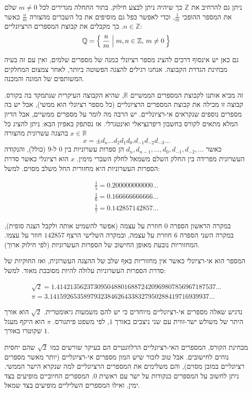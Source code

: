 \documentclass[12pt]{report}
\theoremstyle{plain}
\theoremstyle{definition}
\newcommand{\R}{\mathbb{R}}
\newcommand{\Z}{\mathbb{Z}}
\newcommand{\Q}{\mathbb{Q}}
\newcommand{\0}{\mathbf{0}}
\begin{document}
ניתן גם להרחיב את $\Z$ כך שיהיה ניתן לבצע חילוק. בתור
התחלה מגדירים לכל $m\neq0$ שלם את המספר ההופכי $\frac{1}{m}$,
וכדי לאפשר כפל גם מוסיפים את כל השברים מהצורה $\frac{n}{m}$ כאשר
$n\in\Z$. כך מקבלים את קבוצת המספרים הרציונליים:
$$
\Q=\Set{\frac{n}{m}|m,n\in\Z,\,m\neq0}
$$

גם כאן יש אינסוף דרכים להציג מספר רציונלי כמנה של מספרים שלמים, ואין
עם זה בעיה מבחינת הגדרת הקבוצה. אנחנו רגילים להצגה הפשוטה ביותר, לאחר
צמצום המחלקים המשותפים של המונה והמכנה.

זה מביא אותנו לקבוצת המספרים הממשיים $\R$, שהיא הקבוצה
העיקרית שנתמקד בה בקורס. קבוצה זו מכילה את קבוצת המספרים הרציונליים (כל מספר רציונלי הוא ממשי), אבל יש בה מספרים נוספים שנקראים אי-רציונליים.
יש הרבה מה לומר על מספרים ממשיים, אבל הדיון המלא מתאים לקורס בחשבון
דיפרנציאלי ואינטגרלי. אז נסתפק באפיון הבא: ניתן להציג כל $x\in\R$
בהצגה עשרונית מהצורה
$$
x=\pm d_{n}...d_{2}d_{1}d_{0}.d_{-1}d_{-2}d_{-3}...
$$
 כאשר $d_{n},d_{n-1},...,d_{0},d_{-1},d_{-2},...$ הן ספרות עשרוניות
בין $0$ ל-$9$ (כולל), והנקודה העשרונית מפרידה בין החלק השלם
משמאל לחלק השברי מימין. $x$ הוא רציונלי כאשר סדרת הספרות העשרוניות
היא מחזורית החל משלב מסוים. למשל:

\begin{align*}
\frac{1}{5}=0.200000000000... \\
\frac{1}{6}=0.166666666666...\\
\frac{1}{7}=0.142857142857...
\end{align*}

במקרה הראשון הספרה $0$ חוזרת על עצמה (אפשר להשמיט
אותה ולקבל הצגה סופית), במקרה השני הספרה $6$ חוזרת על עצמה, ובמקרה
השלישי הרצף $142857$ חוזר על עצמו. המחזוריות נובעת מאופן החישוב
של הספרות העשרוניות (לפי חילוק ארוך).

המספר הוא אי-רציונלי כאשר אין מחזוריות באף שלב של ההצגה העשרונית,
ואז החוקיות של סדרת הספרות העשרוניות עלולה להיות מסובכת מאוד. למשל:

\begin{align*}
\sqrt{2}=1.41421356237309504880168872420969807856967187537...\\
\pi=3.14159265358979323846264338327950288419716939937...
\end{align*}

נדגיש שאלה מספרים אי-רציונליים מיוחדים כי יש להם משמעות גיאומטרית.
$\sqrt{2}$ הוא אורך היתר של משולש ישר-זווית עם שני ניצבים באורך
$1$, לפי משפט פיתגורס. $\pi$ הוא היקף מעגל שקוטרו באורך
$1$. 

מבחינת הקורס, המספרים האי-רציונליים הרלוונטיים הם בעיקר שורשים כמו
$\sqrt{2}$ שהם יחסית נוחים לחישובים. אבל טוב לזכור שיש המון מספרים
אי-רציונליים (יותר מאשר מספרים רציונליים במובן מסוים), והם משלימים
את המספרים הרציונליים למה שנקרא הישר הממשי. ניתן לחשוב על המספרים
כנקודות על ישר עם ראשית $0$. המספרים החיוביים מופיעים בצד ימין,
ואילו המספרים השליליים מופיעים בצד שמאל.
\end{document}
